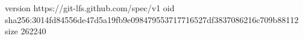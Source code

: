 version https://git-lfs.github.com/spec/v1
oid sha256:3014fd84556de47d5a19fb9e098479553717716527df3837086216c709b88112
size 262240
